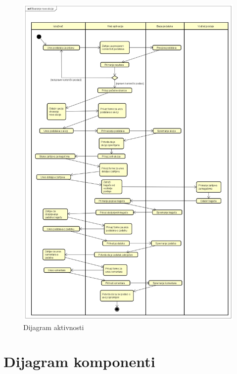 			\begin{figure}[H]
				\includegraphics[scale=0.4]{dijagrami/DijAktivnosti.png} 
				\centering
				\caption{Dijagram aktivnosti}
				\label{fig:promjene}
			\end{figure}
			
			\eject
		\section{Dijagram komponenti}
		
